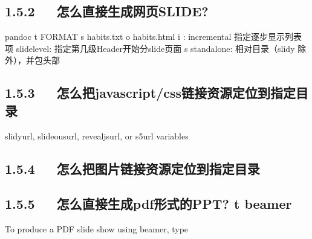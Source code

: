 \documentclass[letterpaper,12pt,english]{sphinxmanual}
\begin{document}
\subsection{1.5.2   怎么直接生成网页SLIDE?}
\label{\detokenize{001software/001install/pandoc:id3}}
\begin{sphinxVerbatim}[commandchars=\\\{\}]
pandoc \PYGZhy{}t FORMAT \PYGZhy{}s habits.txt \PYGZhy{}o habits.html
\PYGZhy{}i : incremental 指定逐步显示列表项
\PYGZhy{}slide\PYGZhy{}\PYGZhy{}level: 指定第几级Header开始分slide页面
\PYGZhy{}s \PYGZhy{}\PYGZhy{}stand\PYGZhy{}alone: 相对目录（slidy 除外），并包头部
\end{sphinxVerbatim}


\subsection{1.5.3   怎么把javascript/css链接资源定位到指定目录}
\label{\detokenize{001software/001install/pandoc:javascript-css}}
slidy\sphinxhyphen{}url, slideous\sphinxhyphen{}url, revealjs\sphinxhyphen{}url, or s5\sphinxhyphen{}url variables


\subsection{1.5.4   怎么把图片链接资源定位到指定目录}
\label{\detokenize{001software/001install/pandoc:id4}}
\begin{sphinxVerbatim}[commandchars=\\\{\}]
        \PYGZbs{} \PYGZbs{}
\end{sphinxVerbatim}


\subsection{1.5.5   怎么直接生成pdf形式的PPT? \sphinxhyphen{}t beamer}
\label{\detokenize{001software/001install/pandoc:pdfppt-t-beamer}}
To produce a PDF slide show using beamer, type

\begin{sphinxVerbatim}[commandchars=\\\{\}]
     
\end{sphinxVerbatim}
\end{document}
